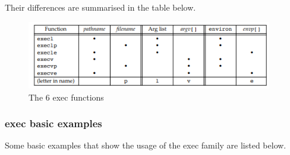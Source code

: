 \documentclass[a4paper]{article}
\begin{document}
Their differences are summarised in the table below.
\begin{figure}[H]
    \centering
    \includegraphics[height=3cm]{img/exec_family_table.png}
    \caption{The 6 exec functions}
\end{figure}

\subsubsection{exec basic examples}


Some basic examples that show the usage of  the exec family are listed below.


\end{document}
